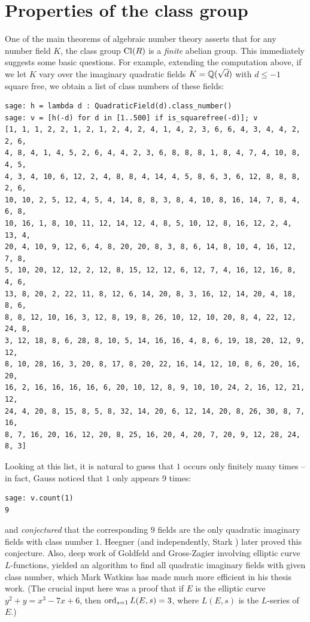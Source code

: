 \documentclass{book}
\begin{document}
\section{Properties of the class group}
One of the main theorems of algebraic number theory asserts that
for any number field $K$, the class group $\operatorname{Cl}(R)$ is a {\em finite}
abelian group.   This immediately suggests some basic questions.
For example, extending the computation above,
if we let $K$ vary over the imaginary quadratic fields
$K=\mathbb{Q}(\sqrt{d})$ with $d\leq -1$ square free, we obtain
a list of class numbers of these fields:
\begin{lstlisting}
sage: h = lambda d : QuadraticField(d).class_number()
sage: v = [h(-d) for d in [1..500] if is_squarefree(-d)]; v
[1, 1, 1, 2, 2, 1, 2, 1, 2, 4, 2, 4, 1, 4, 2, 3, 6, 6, 4, 3, 4, 4, 2, 2, 6,
4, 8, 4, 1, 4, 5, 2, 6, 4, 4, 2, 3, 6, 8, 8, 8, 1, 8, 4, 7, 4, 10, 8, 4, 5,
4, 3, 4, 10, 6, 12, 2, 4, 8, 8, 4, 14, 4, 5, 8, 6, 3, 6, 12, 8, 8, 8, 2, 6,
10, 10, 2, 5, 12, 4, 5, 4, 14, 8, 8, 3, 8, 4, 10, 8, 16, 14, 7, 8, 4, 6, 8,
10, 16, 1, 8, 10, 11, 12, 14, 12, 4, 8, 5, 10, 12, 8, 16, 12, 2, 4, 13, 4,
20, 4, 10, 9, 12, 6, 4, 8, 20, 20, 8, 3, 8, 6, 14, 8, 10, 4, 16, 12, 7, 8,
5, 10, 20, 12, 12, 2, 12, 8, 15, 12, 12, 6, 12, 7, 4, 16, 12, 16, 8, 4, 6,
13, 8, 20, 2, 22, 11, 8, 12, 6, 14, 20, 8, 3, 16, 12, 14, 20, 4, 18, 8, 6,
8, 8, 12, 10, 16, 3, 12, 8, 19, 8, 26, 10, 12, 10, 20, 8, 4, 22, 12, 24, 8,
3, 12, 18, 8, 6, 28, 8, 10, 5, 14, 16, 16, 4, 8, 6, 19, 18, 20, 12, 9, 12,
8, 10, 28, 16, 3, 20, 8, 17, 8, 20, 22, 16, 14, 12, 10, 8, 6, 20, 16, 20,
16, 2, 16, 16, 16, 16, 6, 20, 10, 12, 8, 9, 10, 10, 24, 2, 16, 12, 21, 12,
24, 4, 20, 8, 15, 8, 5, 8, 32, 14, 20, 6, 12, 14, 20, 8, 26, 30, 8, 7, 16,
8, 7, 16, 20, 16, 12, 20, 8, 25, 16, 20, 4, 20, 7, 20, 9, 12, 28, 24, 8, 3]
\end{lstlisting}
Looking at this list, it is natural to guess that $1$ occurs only finitely
many times -- in fact, Gauss noticed that $1$ only appears 9 times:
\begin{lstlisting}
sage: v.count(1)
9
\end{lstlisting}
and {\em conjectured} that the corresponding $9$ fields are the only
quadratic imaginary fields with class number $1$.
Heegner \cite{heegner1952diophantische} (and independently, Stark \cite{stark1969gap}) later proved this conjecture.
Also, deep work of Goldfeld and Gross-Zagier involving elliptic
curve $L$-functions, yielded an algorithm to find all quadratic
imaginary fields with given class number, which Mark Watkins has made
much more efficient in his thesis work.  (The crucial input here
was a proof that if $E$ is the elliptic curve $y^2 + y = x^3 - 7x + 6$,
then $\operatorname{ord}_{s=1}L(E,s)=3$, where $L(E,s)$ is the $L$-series
of $E$.)
\end{document}
